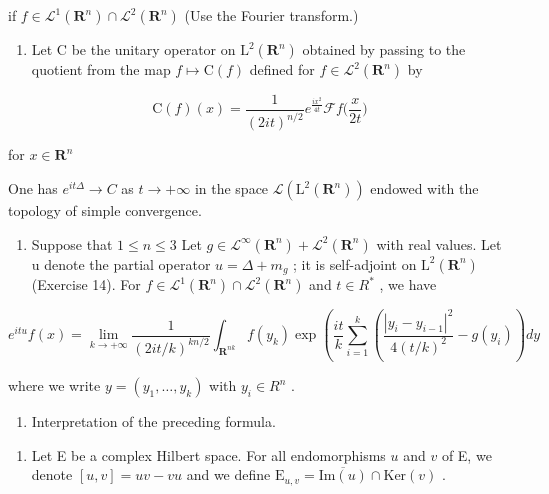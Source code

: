 if \(f\in \mathcal{L}^1 (\mathbf{R}^n)\cap \mathcal{L}^2 (\mathbf{R}^n)\) (Use the Fourier transform.)

\begin{enumerate}
\def\labelenumi{\alph{enumi})}
\setcounter{enumi}{1}
\tightlist
\item
  Let C be the unitary operator on \(\mathrm{L}^{2}(\mathbf{R}^{n})\) obtained by passing to the quotient from the map \(f \mapsto \mathrm{C}(f)\) defined for \(f \in \mathcal{L}^{2}(\mathbf{R}^{n})\) by
\end{enumerate}

\[
\mathrm{C} (f) (x) = \frac {1}{(2 i t) ^ {n / 2}} e ^ {\frac {i x ^ {2}}{4 t}} \mathcal {F} f \Big (\frac {x}{2 t} \Big)
\]

for \(x\in \mathbf{R}^n\)

One has \(e^{it\Delta} \to C\) as \(t \to +\infty\) in the space \(\mathcal{L}(\mathrm{L}^{2}(\mathbf{R}^{n}))\) endowed with the topology of simple convergence.

\begin{enumerate}
\def\labelenumi{\alph{enumi})}
\setcounter{enumi}{2}
\tightlist
\item
  Suppose that \(1 \leqslant n \leqslant 3\) Let \(g \in \mathcal{L}^{\infty}(\mathbf{R}^{n}) + \mathcal{L}^{2}(\mathbf{R}^{n})\) with real values. Let u denote the partial operator \(u = \Delta + m_{g}\) ; it is self-adjoint on \(\mathrm{L}^{2}(\mathbf{R}^{n})\) (Exercise 14). For \(f \in \mathcal{L}^{1}(\mathbf{R}^{n}) \cap \mathcal{L}^{2}(\mathbf{R}^{n})\) and \(t \in R^{*}\) , we have
\end{enumerate}

\[
e ^ {i t u} f (x) = \lim _ {k \rightarrow + \infty} \frac {1}{(2 i t / k) ^ {k n / 2}} \int_ {\mathbf {R} ^ {n k}} f (y _ {k}) \exp \left(\frac {i t}{k} \sum_ {i = 1} ^ {k} \left(\frac {| y _ {i} - y _ {i - 1} | ^ {2}}{4 (t / k) ^ {2}} - g (y _ {i})\right) d y \right.
\]

where we write \(y = (y_{1}, \ldots, y_{k})\) with \(y_{i} \in R^{n}\) .

\begin{enumerate}
\def\labelenumi{\alph{enumi})}
\setcounter{enumi}{3}
\tightlist
\item
  Interpretation of the preceding formula.
\end{enumerate}

\begin{enumerate}
\def\labelenumi{\arabic{enumi})}
\setcounter{enumi}{33}
\tightlist
\item
  Let E be a complex Hilbert space. For all endomorphisms \(u\) and \(v\) of E, we denote \([u,v] = uv - vu\) and we define \(\mathrm{E}_{u,v} = \overline{\mathrm{Im}(u)} \cap \mathrm{Ker}(v)\) .
\end{enumerate}

